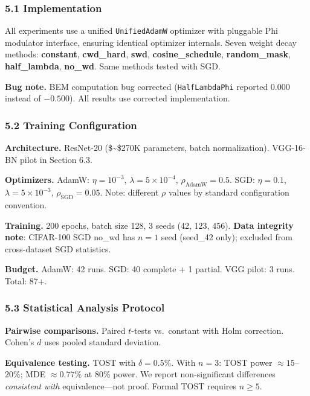 \documentclass[
]{article}
\begin{document}
\hypertarget{implementation}{%
\subsubsection{5.1 Implementation}\label{implementation}}

All experiments use a unified \texttt{UnifiedAdamW} optimizer with
pluggable Phi modulator interface, ensuring identical optimizer
internals. Seven weight decay methods: \textbf{constant},
\textbf{cwd\_hard}, \textbf{swd}, \textbf{cosine\_schedule},
\textbf{random\_mask}, \textbf{half\_lambda}, \textbf{no\_wd}. Same
methods tested with SGD.

\textbf{Bug note.} BEM computation bug corrected (\texttt{HalfLambdaPhi}
reported \(0.000\) instead of \(-0.500\)). All results use corrected
implementation.

\hypertarget{training-configuration}{%
\subsubsection{5.2 Training
Configuration}\label{training-configuration}}

\textbf{Architecture.} ResNet-20 (\$\sim\$270K parameters, batch
normalization). VGG-16-BN pilot in Section 6.3.

\textbf{Optimizers.} AdamW: \(\eta = 10^{-3}\),
\(\lambda = 5 \times 10^{-4}\), \(\rho_{\text{AdamW}} = 0.5\). SGD:
\(\eta = 0.1\), \(\lambda = 5 \times 10^{-3}\),
\(\rho_{\text{SGD}} = 0.05\). Note: different \(\rho\) values by
standard configuration convention.

\textbf{Training.} 200 epochs, batch size 128, 3 seeds (42, 123, 456).
\textbf{Data integrity note}: CIFAR-100 SGD no\_wd has \(n = 1\) seed
(seed\_42 only); excluded from cross-dataset SGD statistics.

\textbf{Budget.} AdamW: 42 runs. SGD: 40 complete + 1 partial. VGG
pilot: 3 runs. Total: 87+.

\hypertarget{statistical-analysis-protocol}{%
\subsubsection{5.3 Statistical Analysis
Protocol}\label{statistical-analysis-protocol}}

\textbf{Pairwise comparisons.} Paired \(t\)-tests vs.~constant with Holm
correction. Cohen's \(d\) uses pooled standard deviation.

\textbf{Equivalence testing.} TOST with \(\delta = 0.5\%\). With
\(n = 3\): TOST power \(\approx 15\)--\(20\%\); MDE \(\approx 0.77\%\)
at 80\% power. We report non-significant differences \emph{consistent
with} equivalence---not proof. Formal TOST requires \(n \geq 5\).
\end{document}
